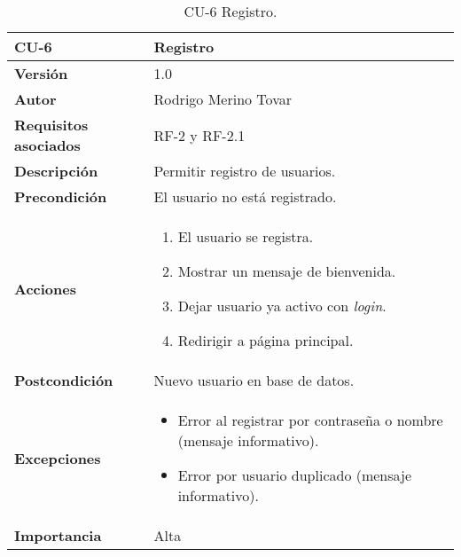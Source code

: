 \begin{table}[p]
	\centering
	\begin{tabularx}{\linewidth}{ p{} p{} }
		\toprule
		\textbf{CU-6}    & \textbf{Registro}\\
		\toprule
		\textbf{Versión}              & 1.0    \\
		\textbf{Autor}                & Rodrigo Merino Tovar \\
		\textbf{Requisitos asociados} & RF-2 y RF-2.1 \\
		\textbf{Descripción}          & Permitir registro de usuarios.\\
		\textbf{Precondición}         & El usuario no está registrado. \\
		\textbf{Acciones}             &
		\begin{enumerate}
			\def\labelenumi{\arabic{enumi}.}
			\tightlist
			\item El usuario se registra. 
			\item Mostrar un mensaje de bienvenida. 
			\item Dejar usuario ya activo con \emph{login}.
			\item Redirigir a página principal.
		\end{enumerate}\\
		\textbf{Postcondición}        & Nuevo usuario en base de datos. \\
		\textbf{Excepciones}          & 
		\begin{itemize}
			\tightlist
			\item Error al registrar por contraseña o nombre (mensaje informativo). 
			\item Error por usuario duplicado (mensaje informativo). 
		\end{itemize}\\
		\textbf{Importancia}          & Alta \\
		\bottomrule
	\end{tabularx}
	\caption{CU-6 Registro.}
\end{table}


